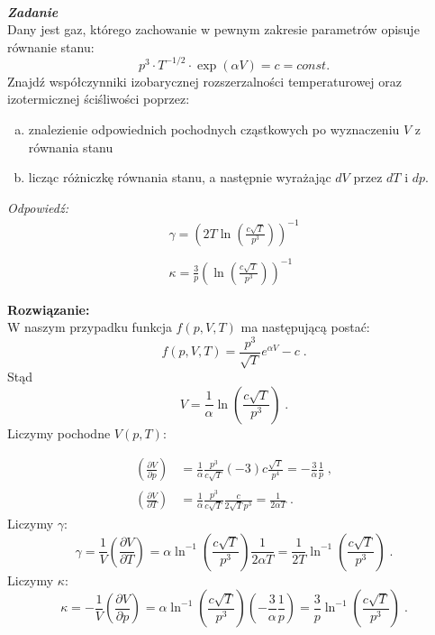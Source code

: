 \documentclass[11pt,a4paper]{article}
\newcounter{zadanie}\newcommand{\zadanie}[1][]{\addtocounter{zadanie}{1} ~\\  {\bf \emph{Zadanie \arabic{zadanie} #1 }} \\}
\newcommand{\Partial}[3]{\left( \frac{\partial #1}{\partial #2} \right)_{#3}}
\begin{document}

\zadanie
Dany jest gaz, którego zachowanie w pewnym zakresie parametrów opisuje równanie stanu:
\[  p^3 \cdot T^{-1/2} \cdot \exp( \alpha V ) = c = const.\]
Znajdź współczynniki izobarycznej rozszerzalności temperaturowej oraz izotermicznej ściśliwości poprzez:
\begin{enumerate}[a)]
\item znalezienie odpowiednich pochodnych cząstkowych po wyznaczeniu $V$ z równania stanu
\item licząc różniczkę równania stanu, a następnie wyrażając $dV$ przez $dT$ i $dp$.
\end{enumerate}

{\it Odpowiedź:}
\[
  \begin{array}{c}
    \gamma = \left(2T \ln\left( \frac{c \sqrt{T}}{p^3} \right) \right)^{-1}\\
    \\
    \kappa = \frac{3}{p} \left( \ln\left( \frac{c \sqrt{T}}{p^3} \right) \right)^{-1}
  \end{array}
\] 

\textbf{Rozwiązanie:}
\\
W naszym przypadku funkcja $f(p, V, T)$ ma następującą postać:
\begin{equation*}
    f(p, V, T) = \frac{p^3}{\sqrt{T}} e^{ \alpha V } - c\;.
\end{equation*}
Stąd 
\[
V = \frac{1}{\alpha} \ln\left( \frac{c \sqrt{T}}{p^3} \right)\;.
\]
Liczymy pochodne  $V(p,T)$:

\begin{align*}
\Partial{V}{p}{} &= \frac{1}{\alpha} \frac{p^3}{c\sqrt{T}} (-3) c \frac{\sqrt{T}}{p^4} = -\frac{3}{\alpha}\frac{1}{p}\;,\\
\Partial{V}{T}{} &= \frac{1}{\alpha} \frac{p^3}{c\sqrt{T}} \frac{c}{2 \sqrt{T} p^3} = \frac{1}{ 2 \alpha T}\;.
\end{align*}
Liczymy $\gamma$:
\[
\gamma = \frac{1}{V}\Partial{V}{T}{} = \alpha \ln^{-1}\left( \frac{c \sqrt{T}}{p^3} \right)\frac{1}{ 2 \alpha T} = \frac{1}{ 2 T} \ln^{-1}\left( \frac{c \sqrt{T}}{p^3} \right) \; .
\]
Liczymy $\kappa$:
\[
\kappa = - \frac{1}{V} \Partial{V}{p}{} = \alpha \ln^{-1}\left( \frac{c \sqrt{T}}{p^3} \right) \left(-\frac{3}{\alpha}\frac{1}{p} \right) = \frac{3}{p} \ln^{-1}\left( \frac{c \sqrt{T}}{p^3} \right) \; .
\]
\newpage
\end{document}
